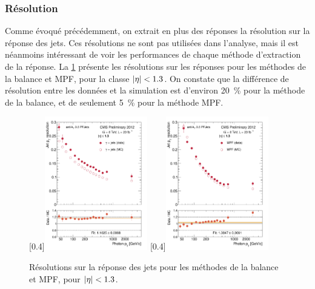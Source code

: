 \subsubsection{Résolution}

Comme évoqué précédemment, on extrait en plus des réponses la résolution sur la réponse des jets. Ces résolutions ne sont pas utilisées dans l'analyse, mais il est néanmoins intéressant de voir les performances de chaque méthode d'extraction de la réponse. La \cref{fig:resolutions} présente les résolutions sur les réponses pour les méthodes de la balance et MPF, pour la classe $\lvert \eta \rvert < \num{1.3}$. On constate que la différence de résolution entre les données et la simulation est d'environ \SI{20}{\percent} pour la méthode de la balance, et de seulement \tilde\SI{5}{\percent} pour la méthode MPF.

\begin{figure}[tbp] \centering
    [0.4\textwidth]{\includegraphics[width=0.4\textwidth]{chapitre4/figs/reso_balancing/resolution_eta013_balancing.pdf}} \qquad
    [0.4\textwidth]{\includegraphics[width=0.4\textwidth]{chapitre4/figs/reso_mpf/resolution_eta013_mpf.pdf}}
    \caption{Résolutions sur la réponse des jets pour les méthodes de la balance et MPF, pour $\lvert \eta \rvert < \num{1.3}$.}
    \label{fig:resolutions}
\end{figure}

